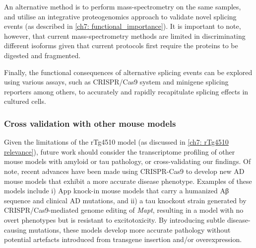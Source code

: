 An alternative method is to perform mass-spectrometry on the same samples, and utilise an integrative proteogenomics approach to validate novel splicing events (as described in \cref{ch7: functional_importance}). It is important to note, however, that current mass-spectrometry methods are limited in discriminating different isoforms given that current protocols first require the proteins to be digested and fragmented. 

Finally, the functional consequences of alternative splicing events can be explored using various assays, such as CRISPR/Cas9 system and minigene splicing reporters among others, to accurately and rapidly recapitulate splicing effects in cultured cells.  


\subsubsection{Cross validation with other mouse models}  
\label{ch7: cross-validation_mouse_models}
Given the limitations of the rTg4510 model (as discussed in \cref{ch7: rTg4510 relevance}), future work should consider the transcriptome profiling of other mouse models with amyloid or tau pathology, or cross-validating our findings. Of note, recent advances have been made using CRISPR-Cas9 to develop new AD mouse models that exhibit a more accurate disease phenotype. Examples of these models include i) App knock-in mouse models that carry a humanized Aβ sequence and clinical AD mutations\cite{Nagata2018, Serneels2020}, and ii) a tau knockout strain generated by CRISPR/Cas9-mediated genome editing of \textit{Mapt}, resulting in a model with no overt phenotypes but is resistant to excitotoxicity\cite{Tan2018}. By introducing subtle disease-causing mutations, these models develop more accurate pathology without potential artefacts introduced from transgene insertion and/or overexpression.


